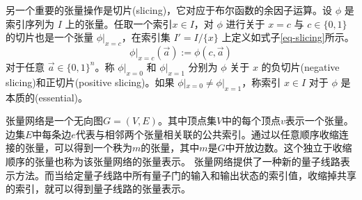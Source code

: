 另一个重要的张量操作是切片(slicing)，它对应于布尔函数的余因子运算。设 $\phi$ 是索引序列为 $I$ 上的张量。任取一个索引\(x\in I\)，对 $\phi$ 进行关于 $x = c$ 与 $c \in \{0, 1\}$ 的切片也是一个张量 $\phi|_{x=c}$，在索引集 $I' =I/\{x\}$ 上定义如式子\ref{eq-slicing}所示。
\begin{equation}
    \label{eq-slicing}
\phi|_{x=c}(\overrightarrow{a}) := \phi(c, \overrightarrow{a})
\end{equation}
对于任意 $\overrightarrow{a} \in \{0, 1\}^n$。称 $\phi|_{x=0}$ 和 $\phi|_{x=1}$ 分别为 $\phi$ 关于 $x$ 的负切片(negative slicing)和正切片(positive slicing)。如果 $\phi|_{x=0} \neq \phi|_{x=1}$，称索引 $x \in I$ 对于 $\phi$ 是本质的(essential)。


张量网络是一个无向图\(G=\left(V,E\right)\)。其中顶点集$V$中的每个顶点$v$表示一个张量。边集\(E\)中每条边\(e\)代表与相邻两个张量相关联的公共索引。通过以任意顺序收缩连接的张量，可以得到一个秩为\(m\)的张量，其中\(m\)是$G$中开放边数。这个独立于收缩顺序的张量也称为该张量网络的张量表示\citep{biamonte2019lectures}。
张量网络提供了一种新的量子线路表示方法\citep{pednault2017breaking}。而当给定量子线路中所有量子门的输入和输出状态的索引值，收缩掉共享的索引，就可以得到量子线路的张量表示。


